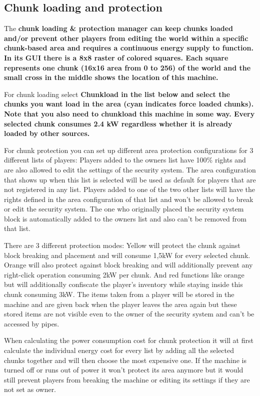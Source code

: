 \documentclass[11pt]{article} %
\begin{document}
\subsection{Chunk loading and protection}
The \bf chunk loading \& protection manager \rm can keep chunks loaded and/or prevent other players from editing the world within a specific chunk-based area and requires a continuous energy supply to function. In its GUI there is a 8x8 raster of colored squares. Each square represents one chunk (16x16 area from 0 to 256) of the world and the small cross in the middle shows the location of this machine.

For chunk loading select \bf Chunkload \rm in the list below and select the chunks you want load in the area (cyan indicates force loaded chunks). Note that you also need to chunkload this machine in some way. Every selected chunk consumes 2.4 kW regardless whether it is already loaded by other sources.

For chunk protection you can set up different area protection configurations for 3 different lists of players: Players added to the owners list have 100\% rights and are also allowed to edit the settings of the security system. The area configuration that shows up when this list is selected will be used as default for players that are not registered in any list. Players added to one of the two other lists will have the rights defined in the area configuration of that list and won't be allowed to break or edit the security system. The one who originally placed the security system block is automatically added to the owners list and also can't be removed from that list.

There are 3 different protection modes: Yellow will protect the chunk against block breaking and placement and will consume 1,5kW for every selected chunk. Orange will also protect against block breaking and will additionally prevent any right-click operation consuming 2kW per chunk. And red functions like orange but will additionally confiscate the player's inventory while staying inside this chunk consuming 3kW. The items taken from a player will be stored in the machine and are given back when the player leaves the area again but these stored items are not visible even to the owner of the security system and can't be accessed by pipes.

When calculating the power consumption cost for chunk protection it will at first calculate the individual energy cost for every list by adding all the selected chunks together and will then choose the most expensive one. If the machine is turned off or runs out of power it won't protect its area anymore but it would still prevent players from breaking the machine or editing its settings if they are not set as owner. 
\end{document}
